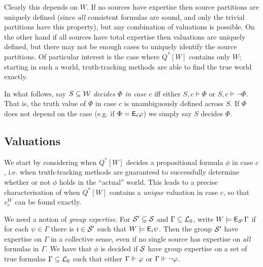 Clearly this depends on $W$. If no sources have expertise then
source partitions are uniquely defined (since \emph{all} consistent formulas
are sound, and only the trivial partitions have this property), but any
combination of valuations is possible. On the other hand if all sources have
total expertise then valuations are uniquely defined, but there may not be
enough cases to uniquely identify the source partitions. Of particular interest
is the case where $Q^*[W]$ contains only $W$; starting in such a world,
truth-tracking methods are able to find the true world exactly.

In what follows, say $S \subseteq \mathcal{W}$ \emph{decides $\Phi$ in case
$c$} iff either $S, c \models \Phi$ or $S, c \models \neg\Phi$. That is, the
truth value of $\Phi$ in case $c$ is unambiguously defined across $S$. If
$\Phi$ does not depend on the case (e.g. if $\Phi = \mathsf{E}_i\varphi$) we simply say
$S$ decides $\Phi$.

\subsection{Valuations}

We start by considering when $Q^*[W]$ decides a propositional formula $\phi$ in
case $c$, i.e. when truth-tracking methods are guaranteed to successfully
determine whether or not $\phi$ holds in the ``actual'' world. This leads to a
precise characterisation of when $Q^*[W]$ contains a \emph{unique} valuation in
case $c$, so that $v^W_c$ can be found exactly.

We need a notion of \emph{group expertise}. For $\mathcal{S}' \subseteq \mathcal{S}$ and
$\Gamma \subseteq \mathcal{L}_0$, write $W \models \mathsf{E}_{\mathcal{S}'}{\Gamma}$ if for each
$\psi \in \Gamma$ there is $i \in \mathcal{S}'$ such that $W \models \mathsf{E}_i\psi$. Then
the group $\mathcal{S}'$ have expertise on $\Gamma$ in a collective sense, even if no
single source has expertise on \emph{all} formulas in $\Gamma$.\footnotemark{}
%
We have that $\phi$ is decided if $\mathcal{S}$ have group expertise on a set of true
formulas $\Gamma \subseteq \mathcal{L}_0$ such that either $\Gamma \Vdash \varphi$
or $\Gamma \Vdash \neg\varphi$.


